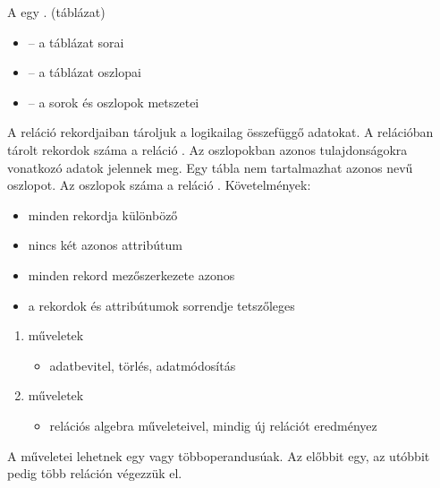 \documentclass[main.tex]{subfiles}
\begin{document}
  A  egy . (táblázat)
  \begin{itemize}
    \item {} \tabto{2.5cm} – \tabto{3.2cm}
    a táblázat sorai
    
    \item {} \tabto{2.5cm} – \tabto{3.2cm}
    a táblázat oszlopai

    \item {} \tabto{2.5cm} – \tabto{3.2cm}
    a sorok és oszlopok metszetei
  \end{itemize}

  A reláció rekordjaiban tároljuk a logikailag összefüggő adatokat.
  A relációban tárolt rekordok száma a reláció .
  Az oszlopokban azonos tulajdonságokra vonatkozó adatok jelennek meg.
  Egy tábla nem tartalmazhat azonos nevű oszlopot.
  Az oszlopok száma a reláció . Követelmények:
  \begin{itemize}
    \item minden rekordja különböző
    \item nincs két azonos attribútum
    \item minden rekord mezőszerkezete azonos
    \item a rekordok és attribútumok sorrendje tetszőleges
  \end{itemize}

  \begin{enumerate}
    \item {} műveletek
    \begin{itemize}
      \item adatbevitel, törlés, adatmódosítás
    \end{itemize}

    \item {} műveletek
    \begin{itemize}
      \item relációs algebra műveleteivel,
      mindig új relációt eredményez
    \end{itemize}
  \end{enumerate}

  A  műveletei lehetnek
  egy vagy többoperandusúak. Az előbbit egy, az
  utóbbit pedig több reláción végezzük el.
\end{document}

